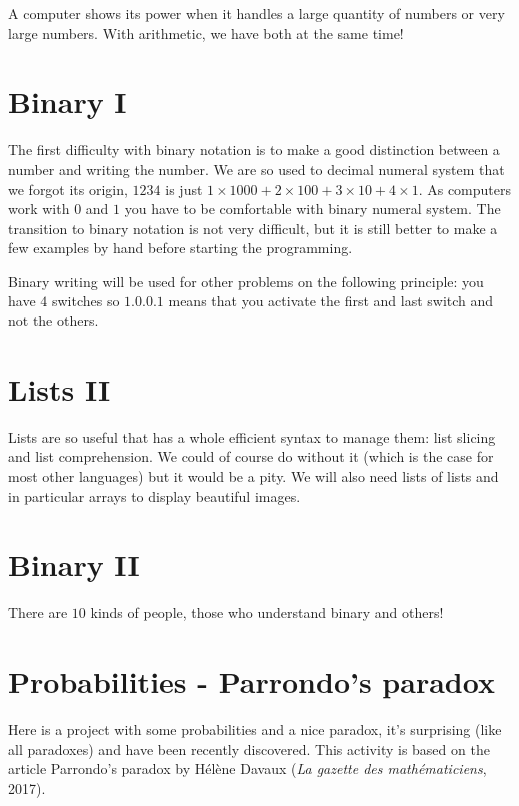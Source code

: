 \documentclass[11pt,class=report,crop=false]{standalone}
\begin{document}
A computer shows its power when it handles a large quantity of numbers or very large numbers. With arithmetic, we have both at the same time!


\section{Binary I}

The first difficulty with binary notation is to make a good distinction between a number and writing the number. We are so used to decimal numeral system that we forgot its origin, $1234$ is just $1\times 1000 + 2 \times 100 + 3 \times 10 + 4\times 1$.
As computers work with $0$ and $1$ you have to be comfortable with binary numeral system. The transition to binary notation is not very difficult, but it is still better to make a few examples by hand before starting the programming.

Binary writing will be used for other problems on the following principle: you have $4$ switches so $1.0.0.1$ means that you activate the first and last switch and not the others.


\section{Lists II}

Lists are so useful that \Python{} has a whole efficient syntax to manage them: list slicing and list comprehension. We could of course do without it (which is the case for most other languages) but it would be a pity.
We will also need lists of lists and in particular arrays to display beautiful images.


\section{Binary II}

There are $10$ kinds of people, those who understand binary and others!


\section{Probabilities - Parrondo's paradox}

Here is a project with some probabilities and a nice paradox, it's surprising (like all paradoxes) and have been recently discovered.
This activity is based on the article \og{}Parrondo's paradox\fg{} by Hélène Davaux (\emph{La gazette des mathématiciens}, 2017).
\end{document}

